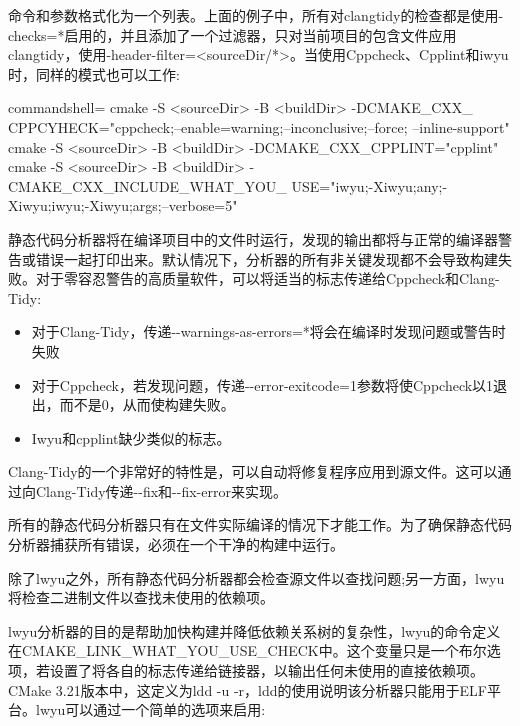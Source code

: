 命令和参数格式化为一个列表。上面的例子中，所有对clangtidy的检查都是使用-checks=*启用的，并且添加了一个过滤器，只对当前项目的包含文件应用clangtidy，使用-header-filter=<sourceDir/*>。当使用Cppcheck、Cpplint和iwyu时，同样的模式也可以工作:

\begin{tcblisting}{commandshell={}}
cmake -S <sourceDir> -B <buildDir> -DCMAKE_CXX_
  CPPCYHECK="cppcheck;--enable=warning;--inconclusive;--force;
    --inline-support"
cmake -S <sourceDir> -B <buildDir> -DCMAKE_CXX_CPPLINT="cpplint"
cmake -S <sourceDir> -B <buildDir> -CMAKE_CXX_INCLUDE_WHAT_YOU_
  USE="iwyu;-Xiwyu;any;-Xiwyu;iwyu;-Xiwyu;args;--verbose=5"
\end{tcblisting}

静态代码分析器将在编译项目中的文件时运行，发现的输出都将与正常的编译器警告或错误一起打印出来。默认情况下，分析器的所有非关键发现都不会导致构建失败。对于零容忍警告的高质量软件，可以将适当的标志传递给Cppcheck和Clang-Tidy:

\begin{itemize}
\item 
对于Clang-Tidy，传递-{}-warnings-as-errors=*将会在编译时发现问题或警告时失败

\item 
对于Cppcheck，若发现问题，传递-{}-error-exitcode=1参数将使Cppcheck以1退出，而不是0，从而使构建失败。

\item 
Iwyu和cpplint缺少类似的标志。
\end{itemize}

Clang-Tidy的一个非常好的特性是，可以自动将修复程序应用到源文件。这可以通过向Clang-Tidy传递-{}-fix和-{}-fix-error来实现。

\begin{tcolorbox}[colback=blue!5!white,colframe=blue!75!black,title=增量构建时的注意事项]
所有的静态代码分析器只有在文件实际编译的情况下才能工作。为了确保静态代码分析器捕获所有错误，必须在一个干净的构建中运行。
\end{tcolorbox}

除了lwyu之外，所有静态代码分析器都会检查源文件以查找问题;另一方面，lwyu将检查二进制文件以查找未使用的依赖项。

lwyu分析器的目的是帮助加快构建并降低依赖关系树的复杂性，lwyu的命令定义在CMAKE\_LINK\_WHAT\_YOU\_USE\_CHECK中。这个变量只是一个布尔选项，若设置了将各自的标志传递给链接器，以输出任何未使用的直接依赖项。CMake 3.21版本中，这定义为ldd -u -r，ldd的使用说明该分析器只能用于ELF平台。lwyu可以通过一个简单的选项来启用:

